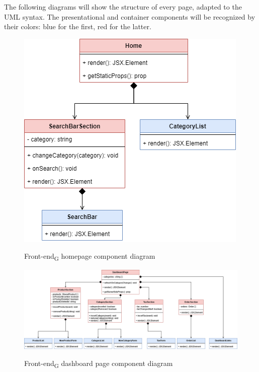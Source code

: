 The following diagrams will show the structure of every page, adapted to the UML syntax. The presentational and container components will be recognized by their colors: blue for the first, red for the latter. 

\begin{figure}[H]
\centering
\includegraphics[scale=0.50]{res/Architettura/Frontend/img/home}\\
\caption{Front-end\textsubscript{G} homepage component diagram}
\end{figure}

\begin{figure}[H]
\centering
\includegraphics[scale=0.40]{res/Architettura/Frontend/img/dashboard}\\
\caption{Front-end\textsubscript{G} dashboard page component diagram}
\end{figure}

